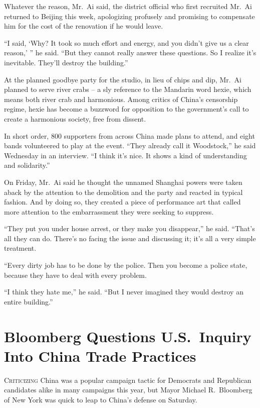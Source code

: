 ﻿\documentclass[12pt]{article}
\begin{document}
Whatever the reason, Mr.~Ai said, the district official who first recruited Mr.~Ai returned to
Beijing this week, apologizing profusely and promising to compensate him for the cost of the
renovation if he would leave.

``I said, `Why? It took so much effort and energy, and you didn't give us a clear reason,' '' he
said. ``But they cannot really answer these questions. So I realize it's inevitable. They'll destroy
the building.''

At the planned goodbye party for the studio, in lieu of chips and dip, Mr.~Ai planned to serve river
crabs -- a sly reference to the Mandarin word hexie, which means both river crab and harmonious.
Among critics of China's censorship regime, hexie has become a buzzword for opposition to the
government's call to create a harmonious society, free from dissent.

In short order, 800 supporters from across China made plans to attend, and eight bands volunteered
to play at the event. ``They already call it Woodstock,'' he said Wednesday in an interview. ``I
think it's nice. It shows a kind of understanding and solidarity.''

On Friday, Mr.~Ai said he thought the unnamed Shanghai powers were taken aback by the attention to
the demolition and the party and reacted in typical fashion. And by doing so, they created a piece
of performance art that called more attention to the embarrassment they were seeking to suppress.

``They put you under house arrest, or they make you disappear,'' he said. ``That's all they can do.
There's no facing the issue and discussing it; it's all a very simple treatment.

``Every dirty job has to be done by the police. Then you become a police state, because they have to
deal with every problem.

``I think they hate me,'' he said. ``But I never imagined they would destroy an entire building.''

\section{Bloomberg Questions U.S.~Inquiry Into China Trade Practices}

\lettrine{C}{riticizing} China was a popular campaign tactic for Democrats
and Republican candidates alike in many campaigns this year, but Mayor Michael R.~Bloomberg of New
York was quick to leap to China's defense on Saturday.
\end{document}

